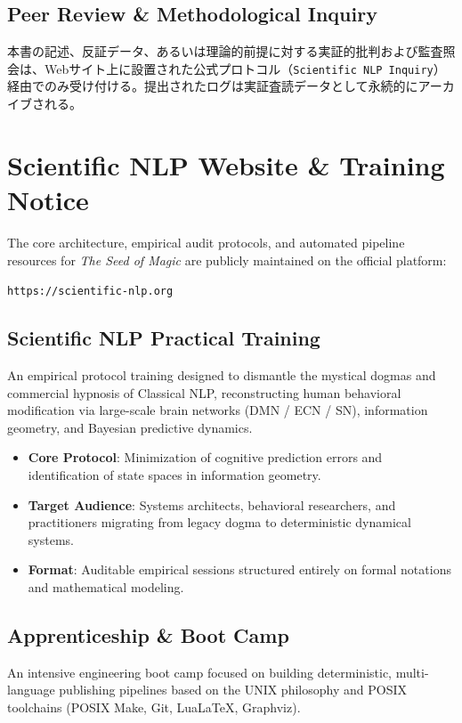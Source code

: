     \section*{Peer Review \& Methodological Inquiry}
    本書の記述、反証データ、あるいは理論的前提に対する実証的批判および監査照会は、Webサイト上に設置された公式プロトコル（\texttt{Scientific NLP Inquiry}）経由でのみ受け付ける。提出されたログは実証査読データとして永続的にアーカイブされる。

\else
    \chapter*{Scientific NLP Website \& Training Notice}

    The core architecture, empirical audit protocols, and automated pipeline resources for \textit{The Seed of Magic} are publicly maintained on the official platform:

    \begin{center}
        
        \par
        {\footnotesize\texttt{https://scientific-nlp.org}}
    \end{center}

    \section*{Scientific NLP Practical Training}
    An empirical protocol training designed to dismantle the mystical dogmas and commercial hypnosis of Classical NLP, reconstructing human behavioral modification via large-scale brain networks (DMN / ECN / SN), information geometry, and Bayesian predictive dynamics.

    \begin{itemize}
        \item \textbf{Core Protocol}: Minimization of cognitive prediction errors and identification of state spaces in information geometry.
        \item \textbf{Target Audience}: Systems architects, behavioral researchers, and practitioners migrating from legacy dogma to deterministic dynamical systems.
        \item \textbf{Format}: Auditable empirical sessions structured entirely on formal notations and mathematical modeling.
    \end{itemize}

    \section*{Apprenticeship \& Boot Camp}
    An intensive engineering boot camp focused on building deterministic, multi-language publishing pipelines based on the UNIX philosophy and POSIX toolchains (POSIX Make, Git, Lua\LaTeX, Graphviz).

